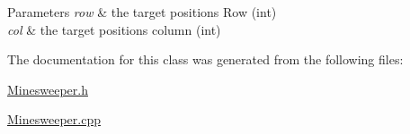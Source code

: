 \begin{DoxyParams}{Parameters}
{\em row} & the target position\textquotesingle{}s Row (int) \\
\hline
{\em col} & the target position\textquotesingle{}s column (int) \\
\hline
\end{DoxyParams}


The documentation for this class was generated from the following files\+:\begin{DoxyCompactItemize}
\item 
\mbox{\hyperlink{_minesweeper_8h}{Minesweeper.\+h}}\item 
\mbox{\hyperlink{_minesweeper_8cpp}{Minesweeper.\+cpp}}\end{DoxyCompactItemize}
